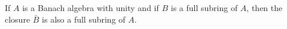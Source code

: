 If $A$ is a Banach algebra with unity and if $B$ is a full subring of $A$, then the closure $\bar{B}$ is also a full subring of $A$.
